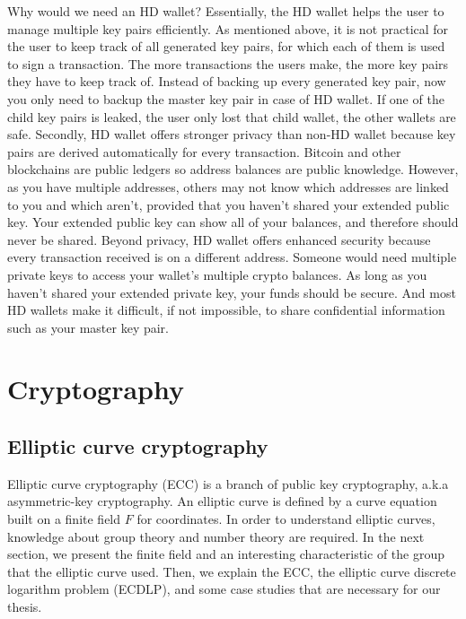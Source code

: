 Why would we need an HD wallet? Essentially, the HD wallet helps the user to manage multiple key pairs efficiently. As mentioned above, it is not practical for the user to keep track of all generated key pairs, for which each of them is used to sign a transaction. The more transactions the users make, the more key pairs they have to keep track of. Instead of backing up every generated key pair, now you only need to backup the master key pair in case of HD wallet. If one of the child key pairs is leaked, the user only lost that child wallet, the other wallets are safe. Secondly, HD wallet offers stronger privacy than non-HD wallet because key pairs are derived automatically for every transaction. Bitcoin and other blockchains are public ledgers so address balances are public knowledge. However, as you have multiple addresses, others may not know which addresses are linked to you and which aren’t, provided that you haven’t shared your extended public key. Your extended public key can show all of your balances, and therefore should never be shared. Beyond privacy, HD wallet offers enhanced security because every transaction received is on a different address. Someone would need multiple private keys to access your wallet’s multiple crypto balances. As long as you haven’t shared your extended private key, your funds should be secure. And most HD wallets make it difficult, if not impossible, to share confidential information such as your master key pair.

\section{Cryptography}
\label{cryptography}

\subsection{Elliptic curve cryptography}

Elliptic curve cryptography (ECC) is a branch of public key cryptography, a.k.a asymmetric-key cryptography. An elliptic curve is defined by a curve equation built on a finite field $F$ for coordinates. In order to understand elliptic curves, knowledge about group theory and number theory are required. In the next section, we present the finite field and an interesting characteristic of the group that the elliptic curve used. Then, we explain the ECC, the elliptic curve discrete logarithm problem (ECDLP), and some case studies that are necessary for our thesis.

